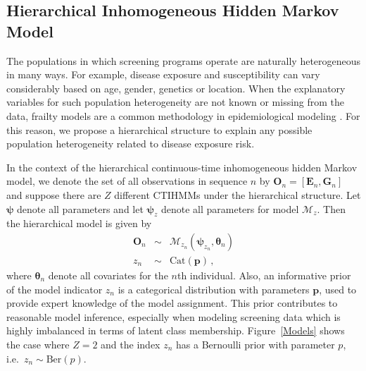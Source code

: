 \documentclass{article}
\begin{document}
\subsection{Hierarchical Inhomogeneous Hidden Markov Model}

The populations in which screening programs operate are naturally heterogeneous in many ways.  For example, disease exposure and susceptibility can vary considerably based on age, gender, genetics or location. 
When the explanatory variables for such population heterogeneity are not known or missing from the data, frailty models are a common methodology in epidemiological modeling \cite{Amy2010}. For this reason, we propose a hierarchical structure to explain any possible population heterogeneity related to disease exposure risk. 

In the context of the hierarchical continuous-time inhomogeneous hidden Markov model, we denote the set of all observations in sequence $n$ by $\bm O_n = [\bm E_n, \bm G_n]$ and suppose there are $Z$ different CTIHMMs under the hierarchical structure. Let $\bm \psi$ denote all parameters and let $\bm \psi_z$ denote all parameters for model $\mathcal{M}_z$. Then the hierarchical model is given by
\begin{eqnarray*}
	\bm O_n & \sim & \mathcal{M}_{z_n}(\bm \psi_{z_n}, \bm \theta_n) \\
	z_n & \sim & \mathrm{Cat}(\bm p)\,, 
\end{eqnarray*}
where $\bm \theta_n$ denote all covariates for the $n$th individual. Also, an informative prior of the model indicator $z_n$ is a categorical distribution with parameters $\bm p$, used to provide expert knowledge of the model assignment. This prior contributes to reasonable model inference, especially when modeling screening data which is highly imbalanced in terms of latent class membership.    Figure~\ref{Models} shows the case where $Z=2$ and the index $z_n$ has a Bernoulli prior with parameter $p$, i.e.\ $z_n \sim \mathrm{Ber}(p)$.
\end{document}
